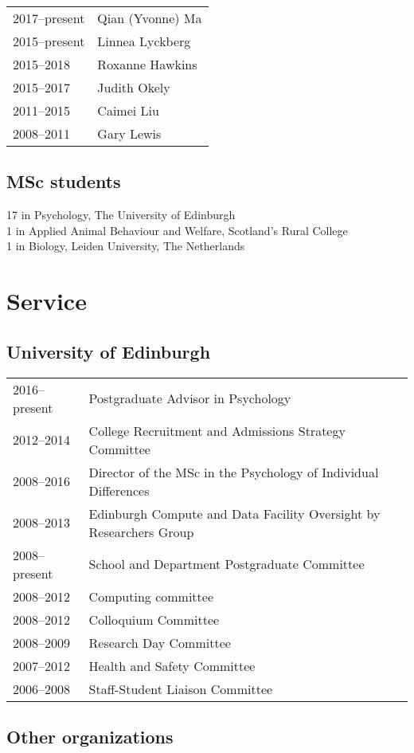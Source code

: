 \documentclass[11pt]{article}
\begin{document}
\begin{tabular}{p{3cm}p{12cm}}
2017--present & Qian (Yvonne) Ma \\
2015--present & Linnea Lyckberg \\
2015--2018 & Roxanne Hawkins \\
2015--2017 & Judith Okely \\
2011--2015 & Caimei Liu \\
2008--2011 & Gary Lewis
\end{tabular}

\subsection*{MSc students}
17 in Psychology, The University of Edinburgh \\
1 in Applied Animal Behaviour and Welfare, Scotland's Rural College \\
1 in Biology, Leiden University, The Netherlands

\section*{Service}
\subsection*{University of Edinburgh}

\begin{tabular}{p{3cm}p{12cm}}
2016--present & Postgraduate Advisor in Psychology \\
2012--2014 & College Recruitment and Admissions Strategy Committee \\
2008--2016 & Director of the MSc in the Psychology of Individual
Differences \\
2008--2013 & Edinburgh Compute and Data Facility Oversight by
Researchers Group \\
2008--present & School and Department Postgraduate Committee \\
2008--2012 & Computing committee \\
2008--2012 & Colloquium Committee \\
2008--2009 & Research Day Committee \\
2007--2012 & Health and Safety Committee \\
2006--2008 & Staff-Student Liaison Committee
\end{tabular}

\subsection*{Other organizations}
\end{document}
